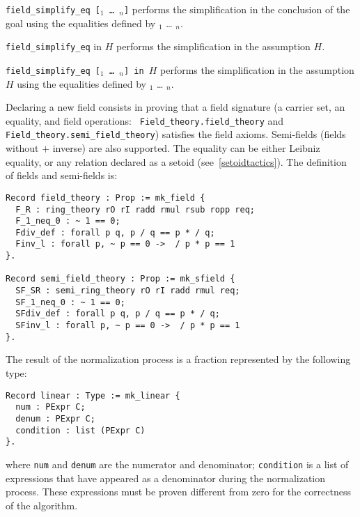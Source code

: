 \begin{Variants}
  \item {\tt field\_simplify\_eq   [\term$_1$ {\ldots} \term$_n$]}
     performs the simplification in the conclusion of the goal using
    the equalities
    defined by \term$_1$ {\ldots} \term$_n$.

  \item {\tt field\_simplify\_eq} in $H$
     performs the simplification in the assumption $H$.

  \item {\tt field\_simplify\_eq   [\term$_1$ {\ldots} \term$_n$] in $H$}
     performs the simplification in the assumption $H$ using
    the equalities
    defined by \term$_1$ {\ldots} \term$_n$.
\end{Variants}


Declaring a new field consists in proving that a field signature (a
carrier set, an equality, and field operations: {\tt
Field\_theory.field\_theory} and {\tt Field\_theory.semi\_field\_theory})
satisfies the field axioms. Semi-fields (fields without $+$ inverse) are
also supported. The equality can be either Leibniz equality, or any
relation declared as a setoid (see~\ref{setoidtactics}). The definition
of fields and semi-fields is:
\begin{verbatim}
Record field_theory : Prop := mk_field {
  F_R : ring_theory rO rI radd rmul rsub ropp req;
  F_1_neq_0 : ~ 1 == 0;
  Fdiv_def : forall p q, p / q == p * / q;
  Finv_l : forall p, ~ p == 0 ->  / p * p == 1
}.

Record semi_field_theory : Prop := mk_sfield {
  SF_SR : semi_ring_theory rO rI radd rmul req;
  SF_1_neq_0 : ~ 1 == 0;
  SFdiv_def : forall p q, p / q == p * / q;
  SFinv_l : forall p, ~ p == 0 ->  / p * p == 1
}.
\end{verbatim}

The result of the normalization process is a fraction represented by
the following type:
\begin{verbatim}
Record linear : Type := mk_linear {
  num : PExpr C;
  denum : PExpr C;
  condition : list (PExpr C)
}.
\end{verbatim}
where {\tt num} and {\tt denum} are the numerator and denominator;
{\tt condition} is a list of expressions that have appeared as a
denominator during the normalization process. These expressions must
be proven different from zero for the correctness of the algorithm.

